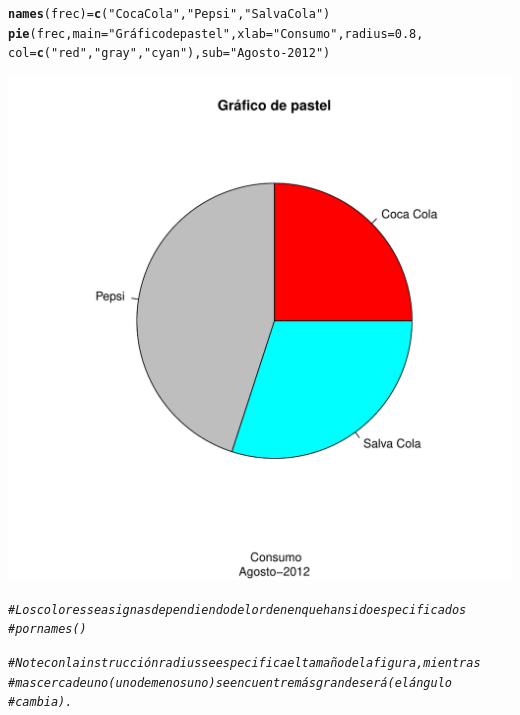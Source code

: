\documentclass[12pt,letterpaper]{article}\usepackage[]{graphicx}\usepackage[]{color}
\makeatletter
\def\maxwidth{ %
  \ifdim\Gin@nat@width>\linewidth
    \linewidth
  \else
    \Gin@nat@width
  \fi
}
\newcommand{\hlnum}[1]{\textcolor[rgb]{0.686,0.059,0.569}{#1}}%
\newcommand{\hlstr}[1]{\textcolor[rgb]{0.192,0.494,0.8}{#1}}%
\newcommand{\hlcom}[1]{\textcolor[rgb]{0.678,0.584,0.686}{\textit{#1}}}%
\newcommand{\hlstd}[1]{\textcolor[rgb]{0.345,0.345,0.345}{#1}}%
\newcommand{\hlkwb}[1]{\textcolor[rgb]{0.69,0.353,0.396}{#1}}%
\newcommand{\hlkwc}[1]{\textcolor[rgb]{0.333,0.667,0.333}{#1}}%
\newcommand{\hlkwd}[1]{\textcolor[rgb]{0.737,0.353,0.396}{\textbf{#1}}}%
\newenvironment{kframe}{%
 \def\at@end@of@kframe{}%
 \ifinner\ifhmode%
  \def\at@end@of@kframe{\end{minipage}}%
  \begin{minipage}{\columnwidth}%
 \fi\fi%
 \def\FrameCommand##1{\hskip\@totalleftmargin \hskip-\fboxsep
 \colorbox{shadecolor}{##1}\hskip-\fboxsep
     \hskip-\linewidth \hskip-\@totalleftmargin \hskip\columnwidth}%
 \MakeFramed {\advance\hsize-\width
   \@totalleftmargin\z@ \linewidth\hsize
   \@setminipage}}%
 {\par\unskip\endMakeFramed%
 \at@end@of@kframe}
\newenvironment{knitrout}{}{} %
\makeatother
\begin{document}
\begin{enumerate}
\begin{knitrout}
\begin{kframe}
\begin{alltt}
\hlkwd{names}\hlstd{(frec)} \hlkwb{=} \hlkwd{c}\hlstd{(}\hlstr{"Coca Cola"}\hlstd{,} \hlstr{"Pepsi"}\hlstd{,} \hlstr{"Salva Cola"}\hlstd{)}
\hlkwd{pie}\hlstd{(frec,} \hlkwc{main}\hlstd{=}\hlstr{"Gráfico de pastel"}\hlstd{,} \hlkwc{xlab}\hlstd{=}\hlstr{" Consumo"}\hlstd{,} \hlkwc{radius}\hlstd{=}\hlnum{0.8}\hlstd{,}
    \hlkwc{col}\hlstd{=}\hlkwd{c}\hlstd{(}\hlstr{"red"}\hlstd{,} \hlstr{"gray"}\hlstd{,} \hlstr{"cyan"}\hlstd{),} \hlkwc{sub}\hlstd{=}\hlstr{"Agosto-2012"}\hlstd{)}
\end{alltt}
\end{kframe}
\includegraphics[width=\maxwidth]{figure/unnamed-chunk-14-1} 
\begin{kframe}\begin{alltt}
\hlcom{# Los colores se asignas dependiendo del orden en que han sido especificados }
\hlcom{# por names()}

\hlcom{# Note con la instrucción radius se especifica el tamaño de la figura, mientras}
\hlcom{# mas cerca de uno (uno de menos uno) se encuentre más grande será (el ángulo}
\hlcom{# cambia). }
\end{alltt}
\end{kframe}
\end{knitrout}


\end{enumerate}
\end{document}
